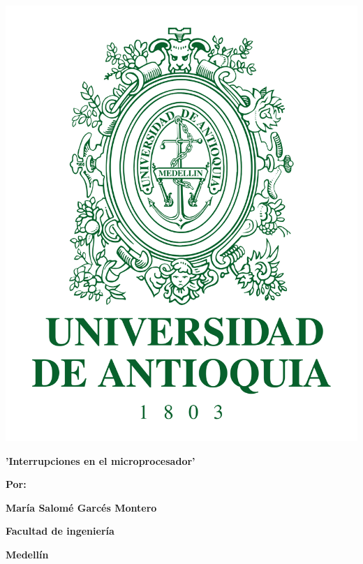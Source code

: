 \documentclass{article}
\begin{document}
\begin{center}
\includegraphics[scale=0.12]{escudo.png}
\end{center}
\vspace{50pt}
\begin{center}
\bf{\sc\Large 'Interrupciones en el microprocesador'}\\
\end{center}
\vspace{50pt}
\begin{center}
\begin{center}
\bf{\sc\large Por:}\\
\end{center}
\bf{\sc\large María Salomé Garcés Montero}\\
\end{center}
\vspace{60pt}
\begin{center}
\bf{\sc\large Facultad de ingeniería}\\
\end{center}
\begin{center}
\bf{\sc\large Medellín}
\end{center}
\end{document}
